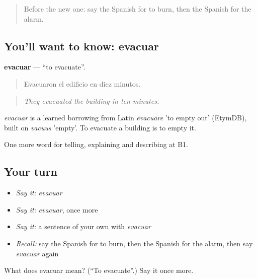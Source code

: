 \label{lesson:ES-C524-evacuar}



\begin{quote}
Before the new one: say the Spanish for to burn, then the Spanish for the alarm.
\end{quote}

\subsection*{You'll want to know: evacuar}
\textbf{evacuar} — \textquotedblleft{}to evacuate\textquotedblright{}.

\begin{quote}
Evacuaron el edificio en diez minutos.
\end{quote}

\begin{quote}
\emph{They evacuated the building in ten minutes.}
\end{quote}

\begin{cousinweb}
\emph{evacuar} is a learned borrowing from Latin \emph{ēvacuāre} 'to empty out' (EtymDB), built on \emph{vacuus} 'empty'. To evacuate a building is to empty it.
\end{cousinweb}

\begin{grammarlens}[title={What you've built}]
One more word for telling, explaining and describing at B1.
\end{grammarlens}

\subsection*{Your turn}
\begin{itemize}
\raggedright
  \item \emph{Say it:} \emph{evacuar}
  \item \emph{Say it:} \emph{evacuar}, once more
  \item \emph{Say it:} a sentence of your own with \emph{evacuar}
  \item \emph{Recall:} say the Spanish for to burn, then the Spanish for the alarm, then say \emph{evacuar} again
\end{itemize}

\begin{tcolorbox}[breakable,colback=teal!4,colframe=teal!35!black,title={Before you move on}]
What does evacuar mean? (\textquotedblleft{}To evacuate\textquotedblright{}.) Say it once more.
\end{tcolorbox}

